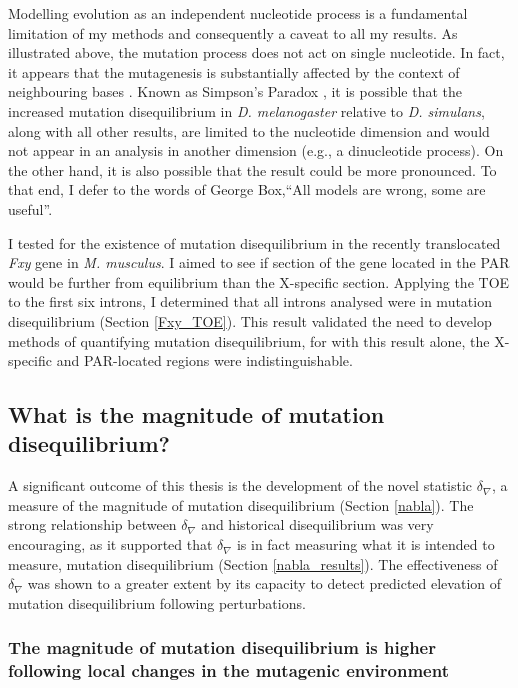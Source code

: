 Modelling evolution as an independent nucleotide process is a fundamental limitation of my methods and consequently a caveat to all my results. As illustrated above, the mutation process does not act on single nucleotide. In fact, it appears that the mutagenesis is substantially affected by the context of neighbouring bases \citep{Zhu2020MachineMutations}. Known as Simpson's Paradox \citep{Simpson1951TheTables}, it is possible that the increased mutation disequilibrium in \textit{D. melanogaster} relative to \textit{D. simulans}, along with all other results, are limited to the nucleotide dimension and would not appear in an analysis in another dimension (e.g., a  dinucleotide process). On the other hand, it is also possible that the result could be more pronounced. To that end, I defer to the words of George Box,``All models are wrong, some are useful''. 

I tested for the existence of mutation disequilibrium in the recently translocated \textit{Fxy} gene in \textit{M. musculus}. I aimed to see if section of the gene located in the PAR would be further from equilibrium than the X-specific section. Applying the TOE to the first six introns, I determined that all introns analysed were in mutation disequilibrium (Section \ref{Fxy_TOE}). This result validated the need to develop methods of quantifying mutation disequilibrium, for with this result alone, the X-specific and PAR-located regions were indistinguishable.

\subsection{What is the magnitude of mutation disequilibrium?}

A significant outcome of this thesis is the development of the novel statistic $\delta_\nabla$, a measure of the magnitude of mutation disequilibrium (Section \ref{nabla}). The strong relationship between $\delta_\nabla$ and historical disequilibrium was very encouraging, as it supported that $\delta_\nabla$ is in fact measuring what it is intended to measure, mutation disequilibrium (Section \ref{nabla_results}). The effectiveness of $\delta_\nabla$ was shown to a greater extent by its capacity to detect predicted elevation of mutation disequilibrium following perturbations.  

\subsubsection{The magnitude of mutation disequilibrium is higher following local changes in the mutagenic environment}

